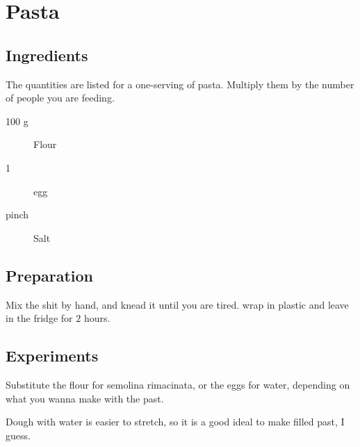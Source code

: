 \setchapterpreamble[u]{\margintoc}
\chapter{Pasta}

\section{Ingredients}
The quantities are listed for a one-serving of pasta. Multiply them by the number of people you are feeding.

\begin{multicols}{2}
	\begin{description}
		\item[100 g] Flour
		\item[1] egg
		\item[pinch] Salt
	\end{description}
\end{multicols}

\section{Preparation}
Mix the shit by hand, and knead it until you are tired. wrap in plastic and leave in the fridge for $2$ hours.

\section{Experiments}
Substitute the flour for semolina rimacinata, or the eggs for water, depending on what you wanna make with the past.

Dough with water is easier to stretch, so it is a good ideal to make filled past, I guess.